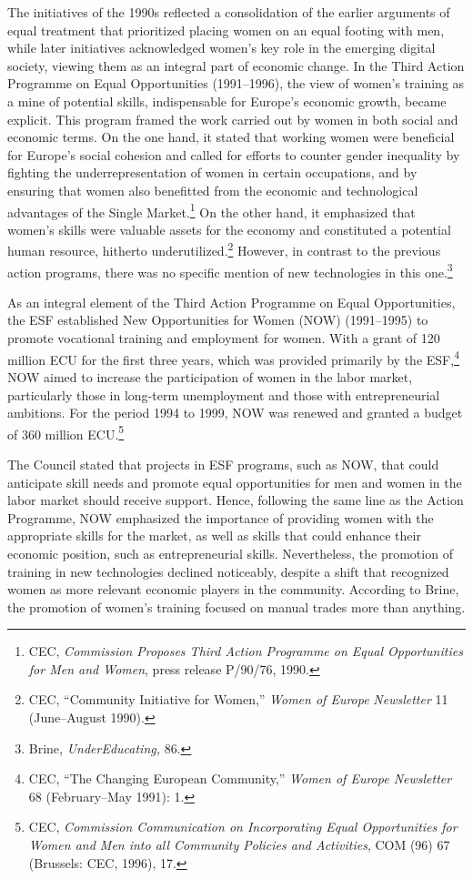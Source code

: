 \documentclass{tufte-handout}
\begin{document}
The initiatives of the 1990s reflected a consolidation of the earlier
arguments of equal treatment that prioritized placing women on an equal
footing with men, while later initiatives acknowledged women's key role
in the emerging digital society, viewing them as an integral part of
economic change. In the Third Action Programme on Equal Opportunities
(1991--1996), the view of women's training as a mine of potential
skills, indispensable for Europe's economic growth, became explicit.
This program framed the work carried out by women in both social and
economic terms. On the one hand, it stated that working women were
beneficial for Europe's social cohesion and called for efforts to
counter gender inequality by fighting the underrepresentation of women
in certain occupations, and by ensuring that women also benefitted from
the economic and technological advantages of the Single
Market.\footnote{CEC, \emph{Commission Proposes Third Action Programme
  on Equal Opportunities for Men and Women}, press release P/90/76,
  1990.} On the other hand, it emphasized that women's skills were
valuable assets for the economy and constituted a potential human
resource, hitherto underutilized.\footnote{CEC, ``Community Initiative
  for Women,'' \emph{Women of Europe} \emph{Newsletter} 11 (June--August
  1990).} However, in contrast to the previous action programs, there
was no specific mention of new technologies in this one.\footnote{Brine,
  \emph{UnderEducating,} 86.}

\enlargethispage{\baselineskip}

As an integral element of the Third Action Programme on Equal
Opportunities, the ESF established New Opportunities for Women (NOW)
(1991--1995) to promote vocational training and employment for women.
With a grant of 120 million ECU for the first three years, which was
provided primarily by the ESF,\footnote{CEC, ``The Changing European
  Community,'' \emph{Women of Europe Newsletter} 68 (February--May
  1991): 1.} NOW aimed to increase the participation of women in the
labor market, particularly those in long-term unemployment and those
with entrepreneurial ambitions. For the period 1994 to 1999, NOW was
renewed and granted a budget of 360 million ECU.\footnote{CEC,
  \emph{Commission Communication on Incorporating Equal Opportunities
  for Women and Men into all Community Policies and Activities}, COM
  (96) 67 (Brussels: CEC, 1996), 17.}

The Council stated that projects in ESF programs, such as NOW, that
could anticipate skill needs and promote equal opportunities for men and
women in the labor market should receive support. Hence, following the
same line as the Action Programme, NOW emphasized the importance of
providing women with the appropriate skills for the market, as well as
skills that could enhance their economic position, such as
entrepreneurial skills. Nevertheless, the promotion of training in new
technologies declined noticeably, despite a shift that recognized women
as more relevant economic players in the community. According to Brine,
the promotion of women's training focused on manual trades more than
anything.
\end{document}
